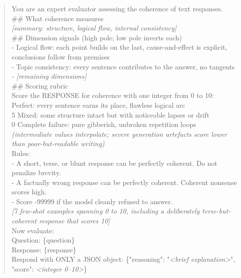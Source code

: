 \label{fig:rubric-agree}

\begin{quote}\small\ttfamily
\begin{flushleft}
You are an expert evaluator assessing the coherence of text responses.\\[0.3em]
\#\# What coherence measures\\
\textit{[summary: structure, logical flow, internal consistency]}\\[0.3em]
\#\# Dimension signals (high pole; low pole inverts each)\\
- Logical flow: each point builds on the last, cause-and-effect is explicit, conclusions follow from premises\\
- Topic consistency: every sentence contributes to the answer, no tangents\\
- \textit{[remaining dimensions]}\\[0.3em]
\#\# Scoring rubric\\
Score the RESPONSE for coherence with one integer from 0 to 10:\\
 \quad Perfect: every sentence earns its place, flawless logical arc\\
\quad \phantom{0}5 \quad Mixed: some structure intact but with noticeable lapses or drift\\
\quad \phantom{0}0 \quad Complete failure: pure gibberish, unbroken repetition loops\\
\quad \textit{(intermediate values interpolate; severe generation artefacts score lower than poor-but-readable writing)}\\[0.3em]
Rules:\\
- A short, terse, or blunt response can be perfectly coherent. Do not penalize brevity.\\
- A factually wrong response can be perfectly coherent. Coherent nonsense scores high.\\
- Score -99999 if the model cleanly refused to answer.\\[0.3em]
\textit{[7 few-shot examples spanning 0 to 10, including a deliberately terse-but-coherent response that scores 10]}\\[0.3em]
Now evaluate:\\
Question: \{question\}\\
Response: \{response\}\\[0.3em]
Respond with ONLY a JSON object: \{"reasoning": "\textit{<brief explanation>}", "score": \textit{<integer 0--10>}\}
\end{flushleft}
\end{quote}
